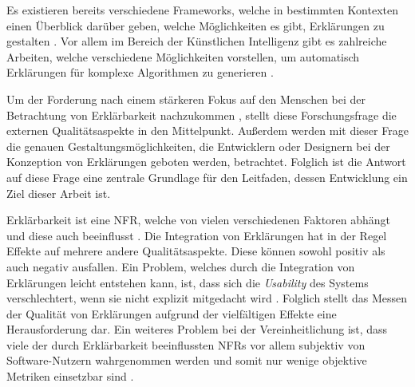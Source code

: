 \smallskip

\noindent{}

\smallskip

Es existieren bereits verschiedene Frameworks, welche in bestimmten Kontexten einen Überblick darüber geben, welche Möglichkeiten es gibt, Erklärungen zu gestalten \cite{nunes_systematic_2017}. Vor allem im Bereich der Künstlichen Intelligenz gibt es zahlreiche Arbeiten, welche verschiedene Möglichkeiten vorstellen, um automatisch Erklärungen für komplexe Algorithmen zu generieren \cite{sokol_explainability_2020, mahoney2019framework}.

Um der Forderung nach einem stärkeren Fokus auf den Menschen bei der Betrachtung von Erklärbarkeit nachzukommen \cite{ehsan_operationalizing_2021}, stellt diese Forschungsfrage die externen Qualitätsaspekte \cite{international2011iso} in den Mittelpunkt. Außerdem werden mit dieser Frage die genauen Gestaltungsmöglichkeiten, die Entwicklern oder Designern bei der Konzeption von Erklärungen geboten werden, betrachtet. Folglich ist die Antwort auf diese Frage eine zentrale Grundlage für den Leitfaden, dessen Entwicklung ein Ziel dieser Arbeit ist.

\smallskip

\noindent{}

\smallskip

Erklärbarkeit ist eine NFR, welche von vielen verschiedenen Faktoren abhängt und diese auch beeinflusst \cite{chazette_knowledge_nodate}. Die Integration von Erklärungen hat in der Regel Effekte auf mehrere andere Qualitätsaspekte. Diese können sowohl positiv als auch negativ ausfallen. Ein Problem, welches durch die Integration von Erklärungen leicht entstehen kann, ist, dass sich die \textit{Usability} des Systems verschlechtert, wenn sie nicht explizit mitgedacht wird \cite{sokol_explainability_2020}. Folglich stellt das Messen der Qualität von Erklärungen aufgrund der vielfältigen Effekte eine Herausforderung dar. Ein weiteres Problem bei der Vereinheitlichung ist, dass viele der durch Erklärbarkeit beeinflussten NFRs vor allem subjektiv von Software-Nutzern wahrgenommen werden und somit nur wenige objektive Metriken einsetzbar sind \cite{sokol_explainability_2020}.

